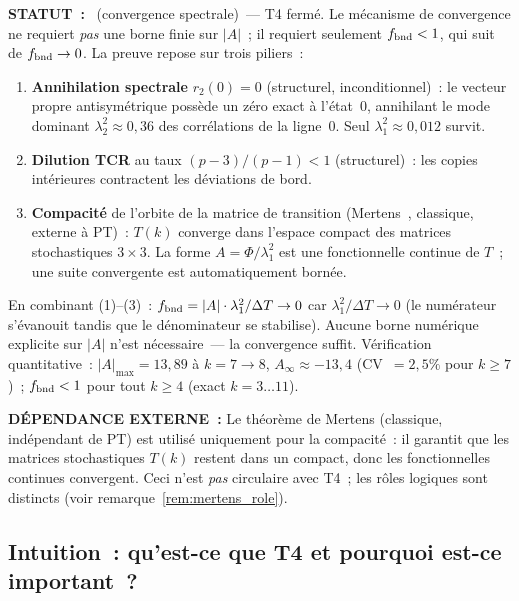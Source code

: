 \documentclass[12pt,a4paper]{article}
\begin{document}
\begin{statusbox}
\textbf{STATUT~:}
  \THMTAG~(convergence spectrale)~--- T4 fermé.
  Le mécanisme de convergence ne requiert \emph{pas} une borne finie
  sur $|A|$~; il requiert seulement $f_{\rm bnd} < 1$, qui suit de
  $f_{\rm bnd} \to 0$. La preuve repose sur trois piliers~:
  \begin{enumerate}[nosep]
  \item \textbf{Annihilation spectrale} $r_2(0) = 0$
    (structurel, inconditionnel)~: le vecteur propre antisymétrique
    possède un zéro exact à l'état~0, annihilant le mode dominant
    $\lambda_2^2 \approx 0{,}36$ des corrélations de la ligne~0.
    Seul $\lambda_1^2 \approx 0{,}012$ survit.
  \item \textbf{Dilution TCR} au taux $(p{-}3)/(p{-}1) < 1$
    (structurel)~: les copies intérieures contractent les déviations
    de bord.
  \item \textbf{Compacité} de l'orbite de la matrice de transition
    (Mertens~\cite{Mertens1874}, classique, externe à PT)~: $T(k)$
    converge dans l'espace compact des matrices stochastiques
    $3\times 3$. La forme $A = \Phi/\lambda_1^2$ est une
    fonctionnelle continue de $T$~; une suite convergente est
    automatiquement bornée.
  \end{enumerate}
  En combinant (1)--(3)~: $f_{\rm bnd} = |A| \cdot \lambda_1^2/\Delta T
  \to 0$ car $\lambda_1^2/\Delta T \to 0$ (le numérateur s'évanouit
  tandis que le dénominateur se stabilise). Aucune borne numérique
  explicite sur $|A|$ n'est nécessaire~--- la convergence suffit.
  Vérification quantitative~: $|A|_{\max} = 13{,}89$ à $k = 7\to 8$,
  $A_\infty \approx -13{,}4$ (CV~$= 2{,}5\%$ pour $k \geq 7$)~;
  $f_{\rm bnd} < 1$ pour tout $k \geq 4$ (exact $k = 3\ldots 11$).

\textbf{DÉPENDANCE EXTERNE~:}
  Le théorème de Mertens (classique, indépendant de PT) est utilisé
  uniquement pour la compacité~: il garantit que les matrices
  stochastiques $T(k)$ restent dans un compact, donc les fonctionnelles
  continues convergent. Ceci n'est \emph{pas} circulaire avec T4~;
  les rôles logiques sont distincts (voir
  remarque~\ref{rem:mertens_role}).
\end{statusbox}

\subsection{Intuition~: qu'est-ce que T4 et pourquoi est-ce important~?}
\label{sec:ch7_intuition}
\end{document}
